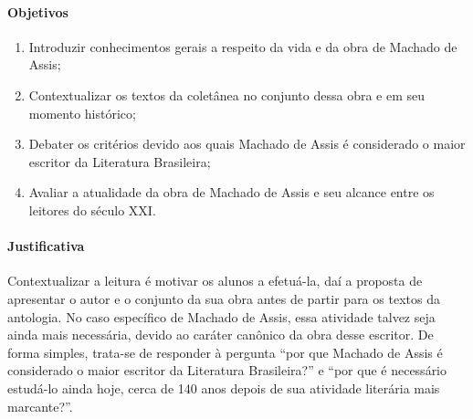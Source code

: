 \documentclass[11pt]{extarticle}
\begin{document}
\paragraph{Objetivos}
\begin{enumerate}
\item
Introduzir conhecimentos gerais a respeito da
vida e da obra de Machado de Assis; 

\item
Contextualizar os textos da
coletânea no conjunto dessa obra e em seu momento histórico; 

\item
Debater os critérios devido aos quais Machado de Assis é considerado o maior
escritor da Literatura Brasileira; 

\item
Avaliar a atualidade da obra de
Machado de Assis e seu alcance entre os leitores do século XXI.
\end{enumerate}

\paragraph{Justificativa} Contextualizar a leitura é motivar os alunos a
efetuá-la, daí a proposta de apresentar o autor e o conjunto da sua obra
antes de partir para os textos da antologia. No caso específico de
Machado de Assis, essa atividade talvez seja ainda mais necessária,
devido ao caráter canônico da obra desse escritor. De forma simples,
trata-se de responder à pergunta ``por que Machado de Assis é
considerado o maior escritor da Literatura Brasileira?'' e ``por que é
necessário estudá-lo ainda hoje, cerca de 140 anos depois de sua
atividade literária mais marcante?''.
\end{document}

